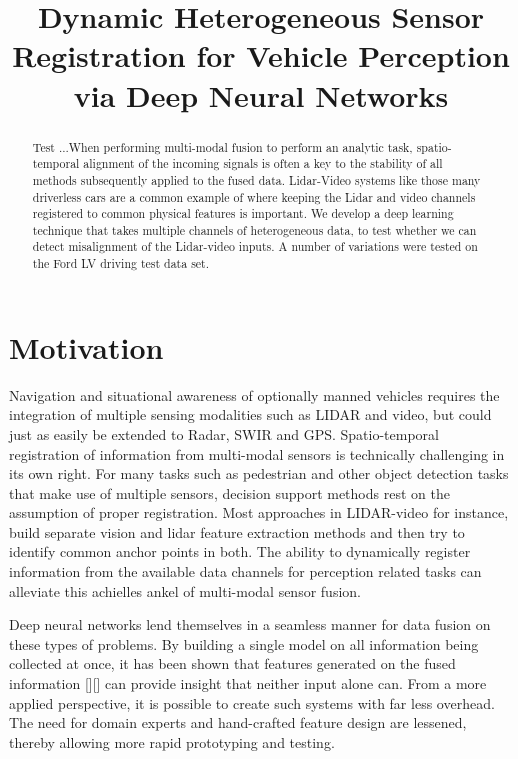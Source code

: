 \documentclass{article}
\title{Dynamic Heterogeneous Sensor Registration for Vehicle Perception via Deep Neural Networks}
\begin{document}

\maketitle

\begin{abstract}
Test ...When performing multi-modal fusion to perform an analytic task, spatio-temporal alignment of the incoming signals is often a key to the stability of all methods subsequently applied to the fused data. Lidar-Video systems like those many driverless cars are a common example of where keeping the Lidar and video channels registered to common physical features is important. We develop a deep learning technique that takes multiple channels of heterogeneous data, to test whether we can detect misalignment of the Lidar-video inputs.  A number of variations were tested on the Ford LV driving test data set. 

\end{abstract}

\section{Motivation}
Navigation and situational awareness of optionally manned vehicles requires the integration of multiple sensing modalities such as LIDAR and video, but could just as easily be extended to  Radar, SWIR and GPS. Spatio-temporal registration of information from multi-modal sensors is technically challenging in its own right. For many tasks such as pedestrian and other object detection tasks that make use of multiple sensors, decision support methods rest on the assumption of proper registration. Most approaches in LIDAR-video for instance, build separate vision and lidar feature extraction methods and then try to identify common anchor points in both. The ability to dynamically register information from the available data channels for perception related tasks can alleviate this achielles ankel of multi-modal sensor fusion.

Deep neural networks lend themselves in a seamless manner for data fusion on these types of problems. By building a single model on all information being collected at once, it has been shown that features generated on the fused information [][] can provide insight that neither input alone can. From a more applied perspective, it is possible to create such systems with far less overhead. The need for domain experts and hand-crafted feature design are lessened, thereby allowing more rapid prototyping and testing. 
\end{document}
